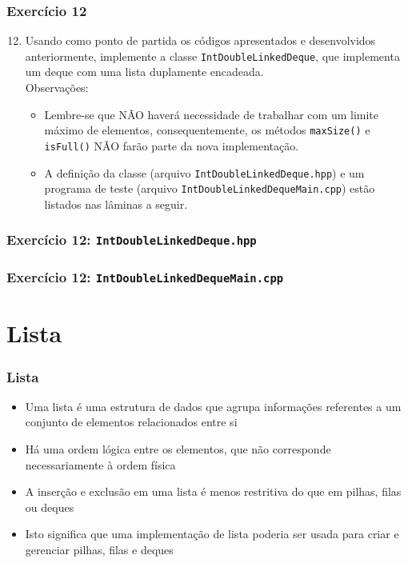 \documentclass[aspectratio=169]{beamer}
\begin{document}
\begin{frame}[fragile]\frametitle{Exercício 12}
\begin{enumerate}
        \setcounter{enumi}{11}
	\item Usando como ponto de partida os códigos apresentados e desenvolvidos anteriormente, implemente a classe \texttt{IntDoubleLinkedDeque}, que implementa um deque com uma lista duplamente encadeada.\\
	Observações:
	\begin{itemize}
		\item Lembre-se que NÃO haverá necessidade de trabalhar com um limite máximo de elementos, consequentemente, os métodos \texttt{maxSize()} e \texttt{isFull()} NÃO farão parte da nova implementação.
		\item A definição da classe (arquivo \texttt{IntDoubleLinkedDeque.hpp}) e um programa de teste (arquivo \texttt{IntDoubleLinkedDequeMain.cpp}) estão listados nas lâminas a seguir.
	\end{itemize}
\end{enumerate}
\end{frame}

\begin{frame}[fragile]\frametitle{Exercício 12: \texttt{IntDoubleLinkedDeque.hpp}}

\end{frame}

\begin{frame}[fragile]\frametitle{Exercício 12: \texttt{IntDoubleLinkedDequeMain.cpp}}
\fontsize{6pt}{6pt}\selectfont{

}
\end{frame}

\section{Lista}

\begin{frame}\frametitle{Lista}
\begin{itemize}
	\item Uma lista é uma estrutura de dados que agrupa informações referentes a um conjunto de elementos relacionados entre si
	\item Há uma ordem lógica entre os elementos, que não corresponde necessariamente à ordem física
	\item A inserção e exclusão em uma lista é menos restritiva do que em pilhas, filas ou deques
	\item Isto significa que uma implementação de lista poderia ser usada para criar e gerenciar pilhas, filas e deques
\end{itemize}
\end{frame}
\end{document}
